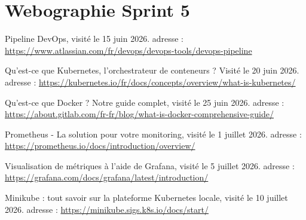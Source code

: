 \newpage
\section*{Webographie Sprint 5}

\begin{enumerate}[label={[\arabic*]}, leftmargin=0.8cm, itemsep=0.3cm, start=15]
  \item \og Pipeline DevOps, \fg{} visit\'e le 15 juin 2026. adresse : \url{https://www.atlassian.com/fr/devops/devops-tools/devops-pipeline}
  \item \og Qu'est-ce que Kubernetes, l'orchestrateur de conteneurs ? \fg{} Visit\'e le 20 juin 2026. adresse : \url{https://kubernetes.io/fr/docs/concepts/overview/what-is-kubernetes/}
  \item \og Qu'est-ce que Docker ? Notre guide complet, \fg{} visit\'e le 25 juin 2026. adresse : \url{https://about.gitlab.com/fr-fr/blog/what-is-docker-comprehensive-guide/}
  \item \og Prometheus - La solution pour votre monitoring, \fg{} visit\'e le 1 juillet 2026. adresse : \url{https://prometheus.io/docs/introduction/overview/}
  \item \og Visualisation de m\'etriques \`a l'aide de Grafana, \fg{} visit\'e le 5 juillet 2026. adresse : \url{https://grafana.com/docs/grafana/latest/introduction/}
  \item \og Minikube : tout savoir sur la plateforme Kubernetes locale, \fg{} visit\'e le 10 juillet 2026. adresse : \url{https://minikube.sigs.k8s.io/docs/start/}
\end{enumerate}
